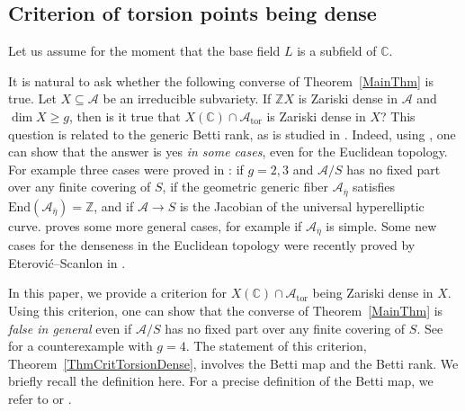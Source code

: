 \documentclass[12pt,oneside]{amsart}
\numberwithin{maincounter}{section}
\numberwithin{equation}{section}
\def\CC{\mathbb{C}}
\def\ZZ{\mathbb{Z}}
\newcommand{\cal}{\mathcal}
\newcommand{\cA}{\cal{A}}
\newcommand{\IC}{{\CC}}
\renewcommand{\subset}{\subseteq} %
\begin{document}
\subsection{Criterion of torsion points being dense}
Let us assume for the moment that the base field $L$ is a subfield of $\IC$.

It is natural to ask whether the following converse of
Theorem~\ref{MainThm} is true.
Let $X\subset \cA$ be an irreducible subvariety.
If $\ZZ X$ is Zariski
dense in $\cA$ and $\dim X \ge g$, then is it true that $X(\IC) \cap
\cA_{\mathrm{tor}}$ is Zariski dense in $X$? This question is
related to the generic Betti rank, as is studied in \cite{ACZBetti}.
Indeed, using \cite[Proposition~2.1.1]{ACZBetti}, one can show that the
answer is yes \textit{in some cases}, even for the Euclidean topology. For example three cases were proved in \cite{ACZBetti}: if $g = 2, 3$ and $\cA/S$ has no fixed part over any finite covering of $S$, if 
the geometric generic fiber $\cA_{\overline{\eta}}$ satisfies 
$\mathrm{End}(\cA_{\overline{\eta}}) = \ZZ$, and if $\cA \rightarrow
S$ is the Jacobian of the universal hyperelliptic curve.
\cite[Theorem~1.4.(i)]{GaoBettiRank} proves some more general cases,
for example if $\cA_{\overline{\eta}}$ is simple. Some new cases for
the denseness in the Euclidean topology were
recently proved by Eterovi\'{c}--Scanlon in \cite{EterovicScanlon}.%

In this paper, we provide a criterion for $X(\IC) \cap \cA_{\mathrm{tor}}$ being Zariski dense in $X$. %
Using this criterion, one can show that the converse of
Theorem~\ref{MainThm} is \textit{false in general} even if $\cA/S$ has
no fixed part over any finite covering of $S$. See  \cite[Example~9.4]{GaoBettiRank} for a counterexample with $g = 4$. 
 The statement of this criterion, Theorem~\ref{ThmCritTorsionDense}, involves the Betti map and the Betti
 rank. We briefly recall the definition here. For a precise definition of the Betti map, we refer to \cite[$\mathsection$3-$\mathsection$4]{GaoBettiRank} or \cite[$\mathsection$2.3 and $\mathsection$B.1]{DGHUnifML}.
\end{document}
